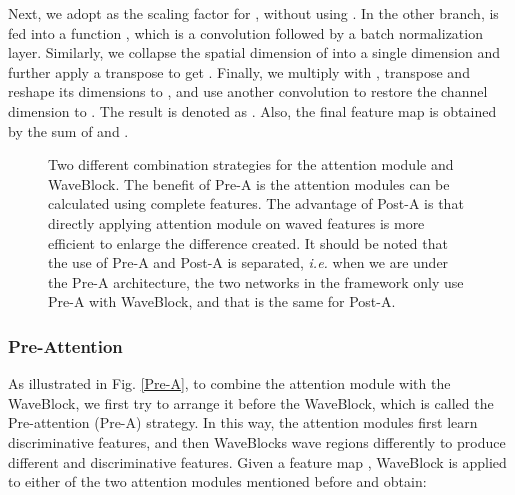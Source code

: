 \documentclass[journal]{IEEEtran}
\begin{document}
Next, we adopt  as the scaling factor for , without using . In the other branch,  is fed into a function , which is a  convolution followed by a batch normalization layer. Similarly, we collapse the spatial dimension of  into a single dimension and further apply a transpose to get . Finally, we multiply  with , transpose and reshape its dimensions to , and use another  convolution  to restore the channel dimension to . The result is denoted as . Also, the final feature map is obtained by the sum of  and .\par 
\begin{figure*}[t]
\centering    
 

 
\caption{Two different combination strategies for the attention module and WaveBlock. The benefit of Pre-A is the attention modules can be calculated using complete features. The advantage of Post-A is that directly applying attention module on waved features is more efficient to enlarge the difference created. It should be noted that the use of Pre-A and Post-A is separated, \textit{i.e.} when we are under the Pre-A architecture, the two networks in the framework only use Pre-A with WaveBlock, and that is the same for Post-A.}
 
\end{figure*}

\subsubsection{Pre-Attention}
As illustrated in Fig. \ref{Pre-A}, to combine the attention module with the WaveBlock, we first try to arrange it before the WaveBlock, which is called the Pre-attention (Pre-A) strategy. In this way, the attention modules first learn discriminative features, and then WaveBlocks wave regions differently to produce different and discriminative features. Given a feature map , WaveBlock is applied to either of the two attention modules mentioned before and obtain:\par
\end{document}
